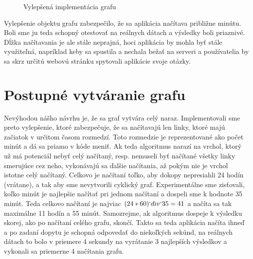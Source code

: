 \begin{figure}[H]
\caption{Vylepšená implementácia grafu}
\label{4_Graph}
\end{figure}

Vylepšenie objektu grafu zabezpečilo, že sa aplikácia načítava približne minútu. Boli sme ju teda schopný otestovať na reálnych dátach a výsledky boli priaznivé. Dĺžka načítavania je ale stále neprajná, hoci aplikácia by mohla byť stále využiteľná, napríklad keby sa spustila a nechala bežať na serveri a používatelia by sa skrz určitú webovú stránku spytovali aplikácie svoje otázky.\newline


\section{Postupné vytváranie grafu}

Nevýhodou nášho návrhu je, že sa graf vytvára celý naraz. Implementovali sme preto vylepšenie, ktoré zabezpečuje, že sa načítavajú len linky, ktoré majú začiatok v určitom časom rozmedzí. Toto rozmedzie je reprezentované ako počet minút a dá sa priamo v kóde meniť. Ak teda algoritmus narazí na vrchol, ktorý už má potenciál nebyť celý načítaný, resp. nemuseli byť načítané všetky linky smerujúce cez neho, vykonávajú sa ďalšie načítania, až pokým nie je vrchol istotne celý načítaný. Celkovo je načítaní toľko, aby dokopy nepresiahli 24 hodín (vrátane), a tak aby sme nevytvorili cyklický graf. Experimentálne sme zisťovali, koľko minút je najlepšie načítať pri jednom načítaní a dospeli sme k hodnote 35 minút. Teda celkovo načítaní je najviac $(24 * 60) `div` 35 = 41$ a načíta sa tak maximálne 11 hodín a 55 minút. Samozrejme, ak algoritmus dospeje k výsledku skorej, ako po načítaní celého grafu, skončí. Takto sa teda aplikácia načíta ihneď a po zadaní dopytu je schopná odpovedať do niekoľkých sekúnd, na reálnych dátach to bolo v priemere 4 sekundy na vyrátanie 3 najlepších výsledkov a vykonali sa priemerne 4 načítania grafu.\newline


